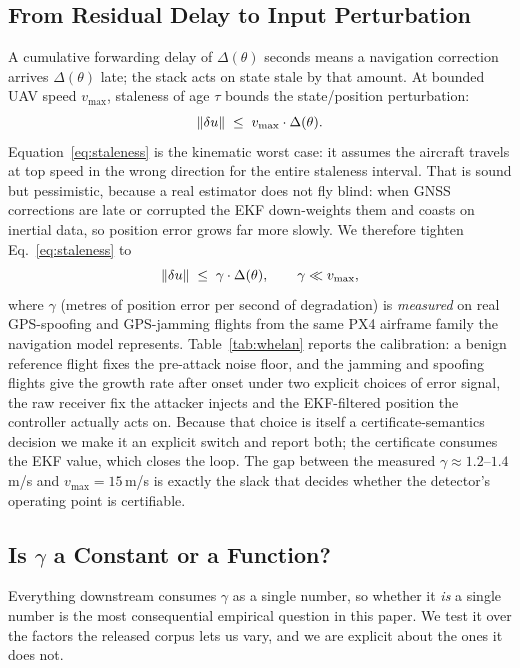 \subsection{From Residual Delay to Input Perturbation}
A cumulative forwarding delay of $\Delta(\theta)$ seconds means a navigation
correction arrives $\Delta(\theta)$ late; the stack acts on state stale by that
amount. At bounded UAV speed $v_{\max}$, staleness of age $\tau$ bounds the
state/position perturbation:
\begin{equation}
\label{eq:staleness}
\left\lVert \delta u\right\rVert \;\le\; v_{\max}\cdot \Delta(\theta).
\end{equation}
Equation~\eqref{eq:staleness} is the kinematic worst case: it assumes the
aircraft travels at top speed in the wrong direction for the entire staleness
interval. That is sound but pessimistic, because a real estimator does not fly
blind: when GNSS corrections are late or corrupted the EKF down-weights them
and coasts on inertial data, so position error grows far more slowly. We
therefore tighten Eq.~\eqref{eq:staleness} to
\begin{equation}
\label{eq:gamma}
\left\lVert \delta u\right\rVert\;\le\;\gamma\cdot\Delta(\theta),\qquad \gamma\ll v_{\max},
\end{equation}
where $\gamma$ (metres of position error per second of degradation) is
\emph{measured} on real GPS-spoofing and GPS-jamming flights from the same PX4
airframe family the navigation model represents. Table~\ref{tab:whelan} reports
the calibration: a benign reference flight fixes the pre-attack noise floor, and
the jamming and spoofing flights give the growth rate after onset under two
explicit choices of error signal, the raw receiver fix the attacker injects
and the EKF-filtered position the controller actually acts on. Because that
choice is itself a certificate-semantics decision we make it an explicit switch
and report both; the certificate consumes the EKF value, which closes the loop.
The gap between the measured $\gamma\approx1.2$--$1.4$\,m/s and
$v_{\max}=15$\,m/s is exactly the slack that decides whether the detector's
operating point is certifiable.

\subsection{Is $\gamma$ a Constant or a Function?}
\label{sec:gammastability}
Everything downstream consumes $\gamma$ as a single number, so whether it
\emph{is} a single number is the most consequential empirical question in this
paper. We test it over the factors the released corpus lets us vary, and we are
explicit about the ones it does not.

